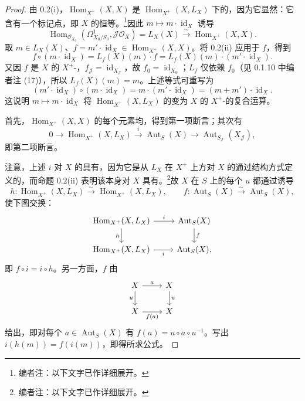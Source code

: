 \begin{proof}
由 0.2(i)，$\operatorname{Hom}_{X^+}(X,X)$ 是 $\operatorname{Hom}_{X^+}(X,L_X)$ 下的，因为它显然：它含有一个标记点，即 $X$ 的恒等。\footnote{编者注：以下文字已作详细展开。}因此 $m\mapsto m\cdot\operatorname{id}_X$ 诱导
\[\operatorname{Hom}_{\mathcal O_{X_0}}(\Omega^1_{X_0/S_0},\mathcal J\mathcal O_X)=L_X(X)\xrightarrow{\sim}\operatorname{Hom}_{X^+}(X,X).\]
取 $m\in L_X(X)$、$f=m'\cdot\operatorname{id}_X\in\operatorname{Hom}_{X^+}(X,X)$。将 0.2(ii) 应用于 $f$，得到
\[f\circ(m\cdot\operatorname{id}_X)=L_f(X)(m)\cdot f=L_f(X)(m)\cdot(m'\cdot\operatorname{id}_X).\]
又因 $f$ 是 $X$ 的 $X^+$-，$f_{\mathcal J}=\operatorname{id}_{X_{\mathcal J}}$，故 $f_0=\operatorname{id}_{X_0}$；$L_f$ 仅依赖 $f_0$（见 0.1.10 中编者注 (17)），所以 $L_f(X)(m)=m$。上述等式可重写为
\[(m'\cdot\operatorname{id}_X)\circ(m\cdot\operatorname{id}_X)=m\cdot(m'\cdot\operatorname{id}_X)=(m+m')\cdot\operatorname{id}_X.\]
这说明 $m\mapsto m\cdot\operatorname{id}_X$ 将 $\operatorname{Hom}_{X^+}(X,L_X)$ 的变为 $X$ 的 $X^+$-的复合运算。

首先，$\operatorname{Hom}_{X^+}(X,X)$ 的每个元素均，得到第一项断言；其次有
\[0\longrightarrow\operatorname{Hom}_{X^+}(X,L_X)\xrightarrow{i}\operatorname{Aut}_S(X)\longrightarrow\operatorname{Aut}_{S_{\mathcal J}}(X_{\mathcal J}),\]
即第二项断言。

注意，上述 $i$ 对 $X$ 的具有，因为它是从 $L_X$ 在 $X^+$ 上方对 $X$ 的通过结构方式定义的，而命题 0.2(ii) 表明该本身对 $X$ 具有。\footnote{编者注：以下文字已作详细展开。}故 $X$ 在 $S$ 上的每个 $u$ 都通过诱导
\[h:\operatorname{Hom}_{X^+}(X,L_X)\xrightarrow{\sim}\operatorname{Hom}_{X^+}(X,L_X),\qquad f:\operatorname{Aut}_S(X)\xrightarrow{\sim}\operatorname{Aut}_S(X),\]
使下图交换：
\[\begin{tikzcd}
\operatorname{Hom}_{X^+}(X,L_X)\arrow[r,"i"]\arrow[d,"h"']&\operatorname{Aut}_S(X)\arrow[d,"f"]\\
\operatorname{Hom}_{X^+}(X,L_X)\arrow[r,"i"']&\operatorname{Aut}_S(X),
\end{tikzcd}\]
即 $f\circ i=i\circ h$。另一方面，$f$ 由
\[\begin{tikzcd}X\arrow[r,"a"]\arrow[d,"u"']&X\arrow[d,"u"]\\X\arrow[r,"f(a)"']&X\end{tikzcd}\]
给出，即对每个 $a\in\operatorname{Aut}_S(X)$ 有 $f(a)=u\circ a\circ u^{-1}$。写出 $i(h(m))=f(i(m))$，即得所求公式。
\end{proof}
